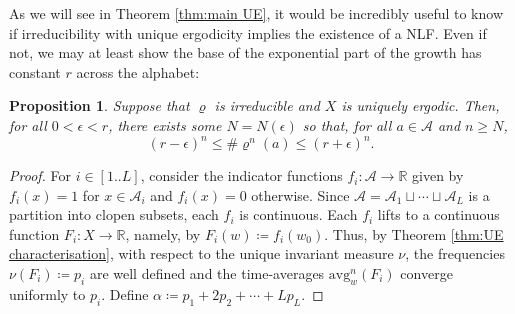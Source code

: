 \documentclass[11pt]{amsart}
\numberwithin{equation}{section}
\theoremstyle{plain}
\newtheorem{proposition}[theorem]{Proposition}
\theoremstyle{definition}
\newcommand{\R}{{\mathbb R}}
\newcommand{\mc}{\mathcal}
\newcommand{\A}{\mc A}
\newcommand{\sub}{\varrho}
\newcommand{\avg}{\mathrm{avg}}
\begin{document}
As we will see in Theorem \ref{thm:main UE}, it would be incredibly useful to know if irreducibility with unique ergodicity implies the existence of a NLF. Even if not, we may at least show the base of the exponential part of the growth has constant \(r\) across the alphabet:

\begin{proposition}\label{prop:superword growth without NLF}
Suppose that \(\sub\) is irreducible and \(X\) is uniquely ergodic. Then, for all \(0 < \epsilon < r\), there exists some \(N = N(\epsilon)\) so that, for all \(a \in \A\) and \(n \geq N\),
\[
(r-\epsilon)^n \leq \# \sub^n(a) \leq (r+\epsilon)^n .
\]
\end{proposition}

\begin{proof}
For \(i \in [1..L]\), consider the indicator functions \(f_i \colon \A \to \R\) given by \(f_i(x) = 1\) for \(x \in \A_i\) and \(f_i(x) = 0\) otherwise. Since \(\A = \A_1 \sqcup \cdots \sqcup \A_L\) is a partition into clopen subsets, each \(f_i\) is continuous. Each \(f_i\) lifts to a continuous function \(F_i \colon X \to \R\), namely, by \(F_i(w) \coloneqq f_i(w_0)\). Thus, by Theorem \ref{thm:UE characterisation}, with respect to the unique invariant measure \(\nu\), the frequencies \(\nu(F_i) \coloneqq p_i\) are well defined and the time-averages \(\avg_w^n(F_i)\) converge uniformly to \(p_i\). Define \(\alpha \coloneqq p_1 + 2p_2 + \cdots + Lp_L\).


\end{proof}
\end{document}
